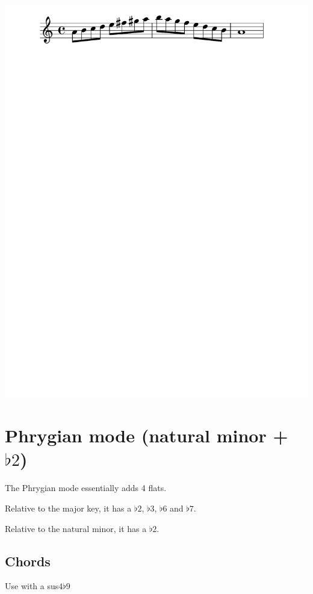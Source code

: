 \documentclass[11pt]{article}
\begin{document}
\begin{center}
\includegraphics[width=.9\linewidth]{a_melodic_minor.pdf}
\end{center}

\section*{Phrygian mode (natural minor + \(\flat{2}\))}
\label{sec:org109a76a}

The Phrygian mode essentially adds 4 flats.

Relative to the major key, it has a \(\flat{2}\), \(\flat{3}\), \(\flat{6}\)  and \(\flat{7}\).

Relative to the natural minor, it has a \(\flat{2}\).

\subsection*{Chords}
\label{sec:org0ad0a48}

Use with a sus\(4\flat{9}\)
\end{document}
